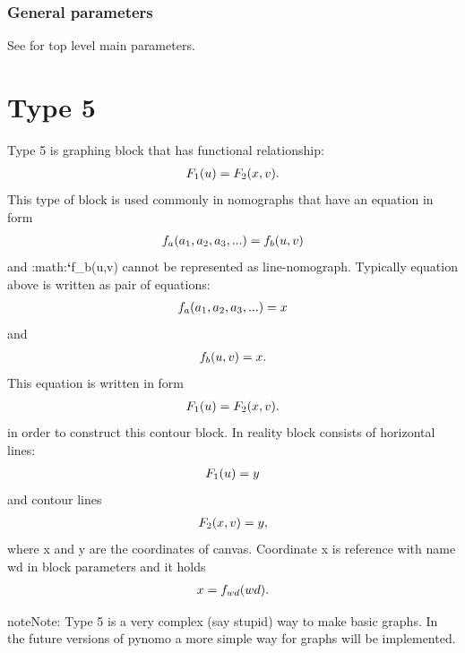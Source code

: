 \documentclass[a4paper,11pt,english]{sphinxmanual}
\begin{document}
\subsubsection{General parameters}
\label{types/types:id24}
See {\hyperref[main_params:id1]{\emph{}}} for top level main parameters.


\section{Type 5}
\label{types/types:type-5}\label{types/types:type5-ref}
Type 5 is graphing block that has functional relationship:
\begin{gather}
\begin{split}F_1(u) = F_2(x,v).\end{split}\notag
\end{gather}
This type of block is used commonly in nomographs that have an equation in form
\begin{gather}
\begin{split}f_a(a_1,a_2,a_3,...) = f_b(u,v)\end{split}\notag
\end{gather}
and :math:{\color{red}\bfseries{}{}`}f\_b(u,v) cannot be represented as line-nomograph.
Typically equation above is written as pair of equations:
\begin{gather}
\begin{split}f_a(a_1,a_2,a_3,...) = x\end{split}\notag
\end{gather}
and
\begin{gather}
\begin{split}f_b(u,v) = x.\end{split}\notag
\end{gather}
This equation is written in form
\begin{gather}
\begin{split}F_1(u) = F_2(x,v).\end{split}\notag
\end{gather}
in order to construct this contour block. In reality block consists of horizontal lines:
\begin{gather}
\begin{split}F_1(u) = y\end{split}\notag
\end{gather}
and contour lines
\begin{gather}
\begin{split}F_2(x,v) = y,\end{split}\notag
\end{gather}
where x and y are the coordinates of canvas. Coordinate x is reference with name wd in block parameters and it holds
\begin{gather}
\begin{split}x = f_{wd}(wd).\end{split}\notag
\end{gather}
\begin{notice}{note}{Note:}
Type 5 is a very complex (say stupid) way to make basic graphs. In the future versions of pynomo a more simple way for graphs will be implemented.
\end{notice}
\end{document}
